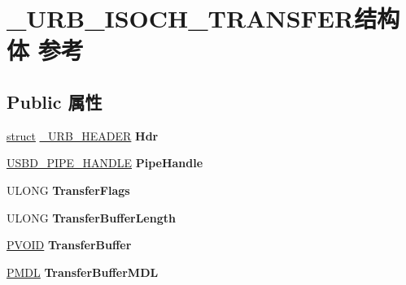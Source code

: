 \hypertarget{struct___u_r_b___i_s_o_c_h___t_r_a_n_s_f_e_r}{}\section{\+\_\+\+U\+R\+B\+\_\+\+I\+S\+O\+C\+H\+\_\+\+T\+R\+A\+N\+S\+F\+E\+R结构体 参考}
\label{struct___u_r_b___i_s_o_c_h___t_r_a_n_s_f_e_r}
\subsection*{Public 属性}
\begin{DoxyCompactItemize}
\item 
\mbox{\label{struct___u_r_b___i_s_o_c_h___t_r_a_n_s_f_e_r_a117ee5e6c2cacd2e2bbae516f35fd4b5}} 
\hyperlink{interfacestruct}{struct} \hyperlink{struct___u_r_b___h_e_a_d_e_r}{\+\_\+\+U\+R\+B\+\_\+\+H\+E\+A\+D\+ER} {\bfseries Hdr}
\item 
\mbox{\label{struct___u_r_b___i_s_o_c_h___t_r_a_n_s_f_e_r_a001978651a119878fdd72bfb4eff9b08}} 
\hyperlink{interfacevoid}{U\+S\+B\+D\+\_\+\+P\+I\+P\+E\+\_\+\+H\+A\+N\+D\+LE} {\bfseries Pipe\+Handle}
\item 
\mbox{\label{struct___u_r_b___i_s_o_c_h___t_r_a_n_s_f_e_r_ae19e0dcbb46b20553c1a6334231c1d3e}} 
U\+L\+O\+NG {\bfseries Transfer\+Flags}
\item 
\mbox{\label{struct___u_r_b___i_s_o_c_h___t_r_a_n_s_f_e_r_accf19dbe257cf5ae4f29e8da0e345c41}} 
U\+L\+O\+NG {\bfseries Transfer\+Buffer\+Length}
\item 
\mbox{\label{struct___u_r_b___i_s_o_c_h___t_r_a_n_s_f_e_r_a72a1f5899077de119ee07e63896aff6f}} 
\hyperlink{interfacevoid}{P\+V\+O\+ID} {\bfseries Transfer\+Buffer}
\item 
\mbox{\label{struct___u_r_b___i_s_o_c_h___t_r_a_n_s_f_e_r_af4e6500b17ad3d6c2a7895ecdbc8dbc7}} 
\hyperlink{interfacevoid}{P\+M\+DL} {\bfseries Transfer\+Buffer\+M\+DL}

\end{DoxyCompactItemize}
